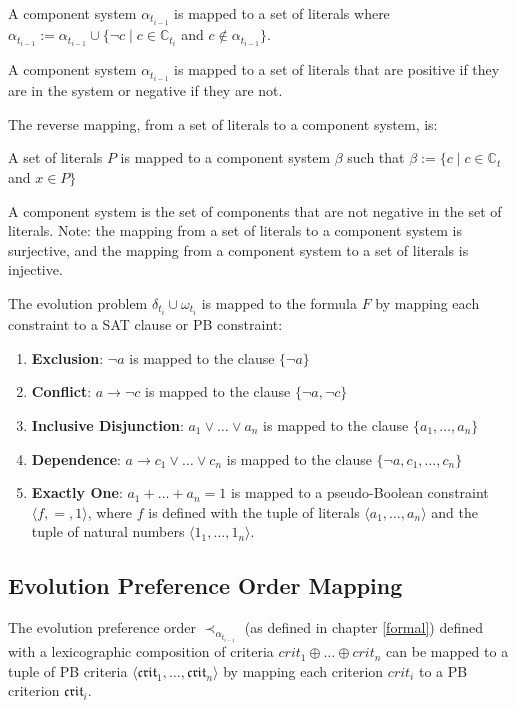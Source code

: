 \begin{defs}
	A component system $\alpha_{t_{i-1}}$ is mapped to a set of literals where
   $\alpha_{t_{i-1}} := \alpha_{t_{i-1}} \cup \{\neg c \mid c \in \mathbb{C}_{t_i}$ and $ c \not \in \alpha_{t_{i-1}}\}$.
\end{defs}
A component system $\alpha_{t_{i-1}}$ is mapped to a set of literals that are positive if they are in the system or negative if they are not.

The reverse mapping, from a set of literals to a component system, is:
\begin{defs}
A set of literals $P$ is mapped to a component system $\beta$ such that $\beta := \{c \mid c \in \mathbb{C}_t$ and $x \in P\}$
\end{defs}
A component system is the set of components that are not negative in the set of literals.  
Note: the mapping from a set of literals to a component system is surjective, and the mapping from a component system to a set of literals is injective.

The evolution problem $\delta_{t_i} \cup \omega_{t_i}$ is mapped to the formula $F$
by mapping each constraint to a SAT clause or PB constraint:
\begin{enumerate}
  \item \textbf{Exclusion}: $\neg a$ is mapped to the clause $\{\neg a\}$
  \item \textbf{Conflict}: $a \rightarrow \neg c $ is mapped to the clause $\{\neg a, \neg c\}$ 
  \item \textbf{Inclusive Disjunction}: $a_1 \vee \ldots \vee a_n $ is mapped to the clause $\{a_1, \ldots,  a_n\}$ 
  \item \textbf{Dependence}: $a \rightarrow c_1 \vee \ldots \vee c_n $ is mapped to the clause $ \{\neg a, c_1, \ldots, c_n\}$
  \item \textbf{Exactly One}: $a_1 + \ldots + a_n = 1 $ is mapped to a pseudo-Boolean constraint $\langle f,=, 1 \rangle$, 
  where $f$ is defined with the tuple of literals $\langle a_1 ,\ldots , a_n\rangle$ and the tuple of natural numbers $\langle 1_1,\ldots,1_n \rangle$.
\end{enumerate}


\subsection{Evolution Preference Order Mapping}
\label{impl.mappingexample}
The evolution preference order $\prec_{\alpha_{t_{i-1}}}$ (as defined in chapter \ref{formal}) defined with a lexicographic composition of criteria $crit_{1} \oplus \ldots \oplus crit_{n}$ 
can be mapped to a tuple of PB criteria $\langle \mathfrak{crit}_1,\ldots,\mathfrak{crit}_n\rangle$
by mapping each criterion $crit_{i}$ to a PB criterion $\mathfrak{crit}_i$.


